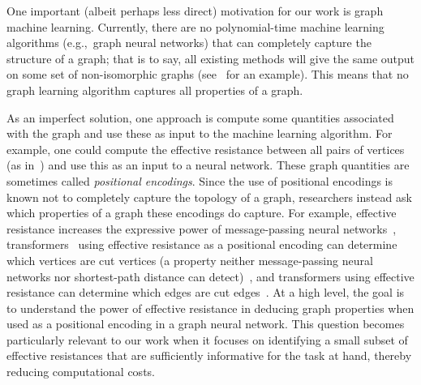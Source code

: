 One important (albeit perhaps less direct) motivation for our work is graph machine learning. Currently, there are no polynomial-time machine learning algorithms (e.g.,~graph neural networks) that can completely capture the structure of a graph; that is to say, all existing methods will give the same output on some set of non-isomorphic graphs (see~\citep{xu2018how} for an example). This means that no graph learning algorithm captures all properties of a graph.
\par 
As an imperfect solution, one approach is compute some quantities associated with the graph and use these as input to the machine learning algorithm. For example, one could compute the effective resistance between all pairs of vertices (as in~\citep{zhang2023rethinking,velingker2024affinity}) and use this as an input to a neural network. These graph quantities are sometimes called \textit{positional encodings}. Since the use of positional encodings is known not to completely capture the topology of a graph, researchers instead ask which properties of a graph these encodings do capture. For example, effective resistance increases the expressive power of message-passing neural networks~\citep{velingker2024affinity}, transformers~\citep{vaswani2017attention} using effective resistance as a positional encoding can determine which vertices are cut vertices (a property neither message-passing neural networks nor shortest-path distance can detect)~\citep{zhang2023rethinking}, and transformers using effective resistance can determine which edges are cut edges~\citep{black2024comparing}. At a high level, the goal is to understand the power of effective resistance in deducing graph properties when used as a positional encoding in a graph neural network. This question becomes particularly relevant to our work when it focuses on identifying a small subset of effective resistances that are sufficiently informative for the task at hand, thereby reducing computational costs.



